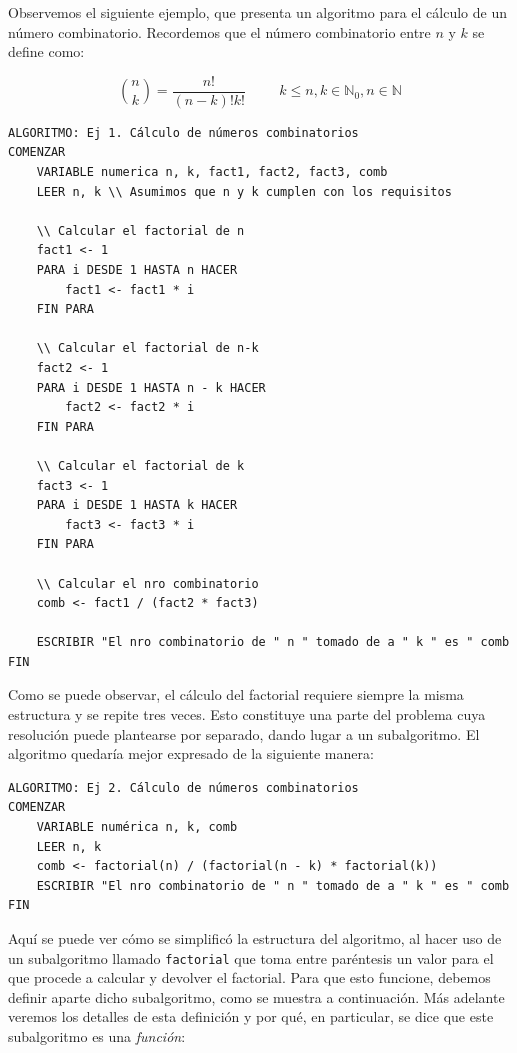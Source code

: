 \documentclass[]{book}
\begin{document}
Observemos el siguiente ejemplo, que presenta un algoritmo para el cálculo de un número combinatorio. Recordemos que el número combinatorio entre \(n\) y \(k\) se define como:

\[ {n \choose k} = \frac{n!}{(n-k)!k!} \hspace{1cm} k \le n, k \in \mathbb{N}_0, n \in \mathbb{N}\]

\begin{verbatim}
ALGORITMO: Ej 1. Cálculo de números combinatorios
COMENZAR
    VARIABLE numerica n, k, fact1, fact2, fact3, comb
    LEER n, k \\ Asumimos que n y k cumplen con los requisitos

    \\ Calcular el factorial de n
    fact1 <- 1
    PARA i DESDE 1 HASTA n HACER
        fact1 <- fact1 * i
    FIN PARA

    \\ Calcular el factorial de n-k
    fact2 <- 1
    PARA i DESDE 1 HASTA n - k HACER
        fact2 <- fact2 * i
    FIN PARA

    \\ Calcular el factorial de k
    fact3 <- 1
    PARA i DESDE 1 HASTA k HACER
        fact3 <- fact3 * i
    FIN PARA

    \\ Calcular el nro combinatorio
    comb <- fact1 / (fact2 * fact3)

    ESCRIBIR "El nro combinatorio de " n " tomado de a " k " es " comb
FIN
\end{verbatim}

Como se puede observar, el cálculo del factorial requiere siempre la misma estructura y se repite tres veces. Esto constituye una parte del problema cuya resolución puede plantearse por separado, dando lugar a un subalgoritmo. El algoritmo quedaría mejor expresado de la siguiente manera:

\begin{verbatim}
ALGORITMO: Ej 2. Cálculo de números combinatorios
COMENZAR
    VARIABLE numérica n, k, comb
    LEER n, k 
    comb <- factorial(n) / (factorial(n - k) * factorial(k))
    ESCRIBIR "El nro combinatorio de " n " tomado de a " k " es " comb
FIN
\end{verbatim}

Aquí se puede ver cómo se simplificó la estructura del algoritmo, al hacer uso de un subalgoritmo llamado \texttt{factorial} que toma entre paréntesis un valor para el que procede a calcular y devolver el factorial. Para que esto funcione, debemos definir aparte dicho subalgoritmo, como se muestra a continuación. Más adelante veremos los detalles de esta definición y por qué, en particular, se dice que este subalgoritmo es una \emph{función}:
\end{document}

